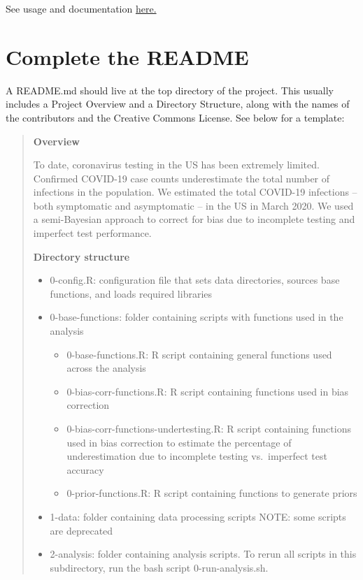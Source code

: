 \documentclass[
]{book}
\begin{document}
See usage and documentation \href{https://jadebc.github.io/lab-manual/unix.html\#example-code-for-runfilesavelogs}{here.}

\hypertarget{complete-the-readme}{%
\section{Complete the README}\label{complete-the-readme}}

A README.md should live at the top directory of the project. This usually includes a Project Overview and a Directory Structure, along with the names of the contributors and the Creative Commons License. See below for a template:

\begin{quote}
\textbf{Overview}

To date, coronavirus testing in the US has been extremely limited. Confirmed COVID-19 case counts underestimate the total number of infections in the population. We estimated the total COVID-19 infections -- both symptomatic and asymptomatic -- in the US in March 2020. We used a semi-Bayesian approach to correct for bias due to incomplete testing and imperfect test performance.

\textbf{Directory structure}

\begin{itemize}
\item
  0-config.R: configuration file that sets data directories, sources base functions, and loads required libraries
\item
  0-base-functions: folder containing scripts with functions used in the analysis

  \begin{itemize}
  \item
    0-base-functions.R: R script containing general functions used across the analysis
  \item
    0-bias-corr-functions.R: R script containing functions used in bias correction
  \item
    0-bias-corr-functions-undertesting.R: R script containing functions used in bias correction to estimate the percentage of underestimation due to incomplete testing vs.~imperfect test accuracy
  \item
    0-prior-functions.R: R script containing functions to generate priors
  \end{itemize}
\item
  1-data: folder containing data processing scripts NOTE: some scripts are deprecated
\item
  2-analysis: folder containing analysis scripts. To rerun all scripts in this subdirectory, run the bash script 0-run-analysis.sh.


\end{itemize}
\end{quote}
\end{document}

